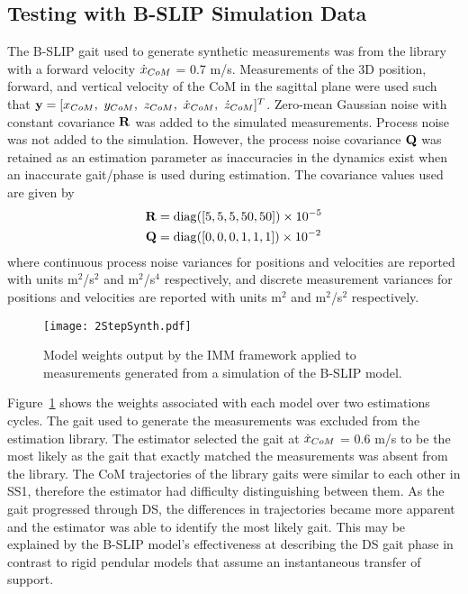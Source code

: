 \subsection{Testing with B-SLIP Simulation Data}

The B-SLIP gait used to generate synthetic measurements was from the library with a forward velocity $ \dot{x}_{CoM} $ = 0.7 m/s. Measurements of the 3D position, forward, and vertical velocity of the CoM in the sagittal plane were used such that $ \y = [x_{\com},\ y_{\com},\ z_{\com},\ \dot{x}_{\com},\ \dot{z}_{\com}]^T $. Zero-mean Gaussian noise with constant covariance $ \mathbf{R} $ was added to the simulated measurements. Process noise was not added to the simulation. However, the process noise covariance $ \mathbf{Q} $ was retained as an estimation parameter as inaccuracies in the dynamics exist when an inaccurate gait/phase is used during estimation. The covariance values used are given by
\begin{align}
	\mathbf{R} &= {\rm diag}([5 ,5 ,5  ,50 ,50]) 
\times 10^{-5} \\
\mathbf{Q} &={\rm diag}([0,0,0,1,1,1])
\times 10^{-2}
\end{align}
where continuous process noise variances for positions and velocities are reported with units m${}^2$/s${}^2$ and m${}^2$/s${}^4$ respectively, and discrete measurement variances for positions and velocities are reported with units m${}^2 $ and m${}^2$/s${}^2$ respectively. 

\begin{figure}
	\centering
	\texttt{[image: 2StepSynth.pdf]}
	\caption{Model weights output by the IMM framework applied to measurements generated from a simulation of the B-SLIP model.}\label{fig:weightSyn}
\end{figure}

Figure~\ref{fig:weightSyn} shows the weights associated with each model over two estimations cycles. The gait used to generate the measurements was excluded from the estimation library. The estimator selected the gait at $ \dot{x}_{CoM} $ = 0.6 m/s to be the most likely as the gait that exactly matched the measurements was absent from the library. The CoM trajectories of the library gaits were similar to each other in SS1, therefore the estimator had difficulty distinguishing between them. As the gait progressed through DS, the differences in trajectories became more apparent and the estimator was able to identify the most likely gait. This may be explained by the B-SLIP model's effectiveness at describing the DS gait phase in contrast to rigid pendular models that assume an instantaneous transfer of support.

